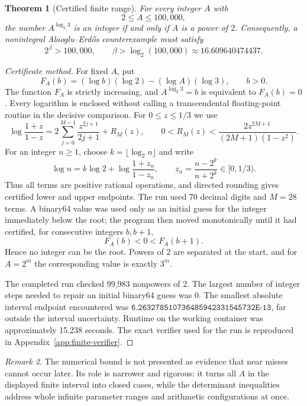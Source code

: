 \documentclass[11pt,oneside]{article}
\newtheorem{theorem}{Theorem}[section]
\theoremstyle{definition}
\theoremstyle{remark}
\newtheorem{remark}[theorem]{Remark}
\begin{document}
\begin{theorem}[Certified finite range]
\label{thm:finite-range}
For every integer $A$ with
\[
  2\le A\le 100,000,
\]
the number $A^{\log_2 3}$ is an integer if and only if $A$ is a power
of $2$.  Consequently, a nonintegral Alaoglu--Erd\H{o}s counterexample must
satisfy
\[
  2^\beta>100,000,
  \qquad
  \beta>\log_2(100,000)\approx 16.609640474437.
\]
\end{theorem}

\begin{proof}[Certificate method]
For fixed $A$, put
\[
  F_A(b)=(\log b)(\log 2)-(\log A)(\log 3),\qquad b>0.
\]
The function $F_A$ is strictly increasing, and
$A^{\log_2 3}=b$ is equivalent to $F_A(b)=0$.
Every logarithm is enclosed without calling a transcendental floating-point
routine in the decisive comparison.  For $0\le z\le 1/3$ we use
\[
  \log\frac{1+z}{1-z}
  =2\sum_{j=0}^{M-1}\frac{z^{2j+1}}{2j+1}+R_M(z),
  \qquad
  0<R_M(z)<
  \frac{2z^{2M+1}}{(2M+1)(1-z^2)}.
\]
For an integer $n\ge1$, choose $k=\lfloor\log_2 n\rfloor$ and write
\[
  \log n=k\log2+
  \log\frac{1+z_n}{1-z_n},
  \qquad
  z_n=\frac{n-2^k}{n+2^k}\in[0,1/3).
\]
Thus all terms are positive rational operations, and directed rounding gives
certified lower and upper endpoints.  The run used 70 decimal digits and
$M=28$ terms.  A binary64 value was used only as an initial guess for the
integer immediately below the root; the program then moved monotonically
until it had certified, for consecutive integers $b,b+1$,
\[
  F_A(b)<0<F_A(b+1).
\]
Hence no integer can be the root.  Powers of $2$ are separated at the start,
and for $A=2^m$ the corresponding value is exactly $3^m$.

The completed run checked 99,983 nonpowers of $2$.  The largest number of
integer steps needed to repair an initial binary64 guess was 0.  The
smallest absolute interval endpoint encountered was
$\texttt{6.263278510736485942331545732E-13}$, far outside the interval uncertainty.  Runtime on the
working container was approximately 15.238 seconds.  The exact verifier
used for the run is reproduced in Appendix~\ref{app:finite-verifier}.
\end{proof}

\begin{remark}
The numerical bound is not presented as evidence that near misses cannot occur
later.  Its role is narrower and rigorous: it turns all $A$ in the displayed
finite interval into closed cases, while the determinant inequalities address
whole infinite parameter ranges and arithmetic configurations at once.
\end{remark}
\end{document}
